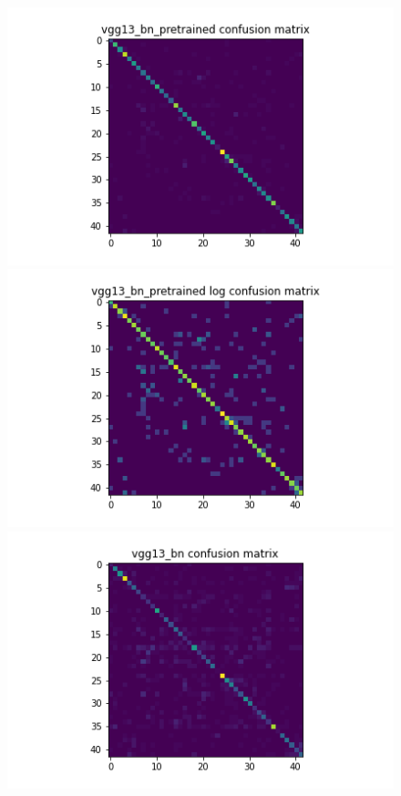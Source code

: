 \begin{figure}[t]

  \begin{minipage}[t]{.5\linewidth}
    \centering
    \includegraphics[width=1.2\textwidth]{figs/conf_matrix/vgg13_bn_pretrained_conf.png}
  \end{minipage}
  \hfill
  \begin{minipage}[t]{.5\linewidth}
    \centering
    \includegraphics[width=1.2\textwidth]{figs/conf_matrix/vgg13_bn_pretrained_log_conf.png}
  \end{minipage}
  \vfill
  \begin{minipage}[b]{.5\linewidth}
    \centering
    \includegraphics[width=1.2\textwidth]{figs/conf_matrix/vgg13_bn_conf.png}

\end{minipage}
\end{figure}
